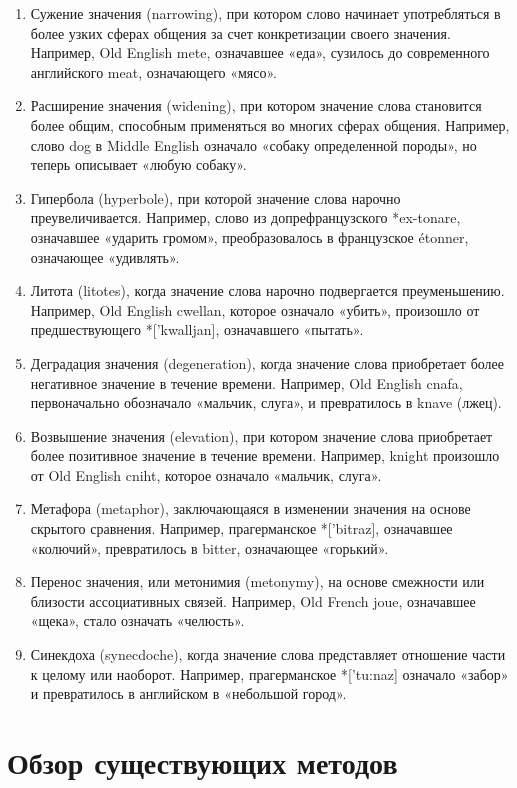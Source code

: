 \documentclass[LI,VKR]{HSEUniversity}
\begin{document}
\begin{enumerate}
    \item Сужение значения (narrowing), при котором слово начинает употребляться
в более узких сферах общения за счет конкретизации своего значения.
Например, Old English mete, означавшее «еда», сузилось до современного английского meat,
означающего «мясо».
    \item Расширение значения (widening), при котором значение слова становится более общим,
способным применяться во многих сферах общения.
Например, слово dog в Middle English означало «собаку определенной породы»,
но теперь описывает «любую собаку».
    \item Гипербола (hyperbole), при которой значение слова нарочно преувеличивается.
Например, слово из допрефранцузского *ex-tonare, означавшее «ударить громом»,
преобразовалось в французское étonner, означающее «удивлять».
    \item Литота (litotes), когда значение слова нарочно подвергается преуменьшению.
Например, Old English cwellan, которое означало «убить», произошло от
предшествующего *['kwalljan], означавшего «пытать».
    \item Деградация значения (degeneration), когда значение слова приобретает
более негативное значение в течение времени.
Например, Old English cnafa, первоначально обозначало «мальчик, слуга», и превратилось в knave
(лжец).
    \item Возвышение значения (elevation), при котором значение слова приобретает
более позитивное значение в течение времени.
Например, knight произошло от Old English cniht, которое означало «мальчик, слуга».
    \item Метафора (metaphor), заключающаяся в изменении значения на основе скрытого сравнения.
Например, прагерманское *['bitraz], означавшее «колючий», превратилось в bitter,
означающее «горький».
    \item Перенос значения, или метонимия (metonymy), на основе смежности
или близости ассоциативных связей.
Например, Old French joue, означавшее «щека», стало означать «челюсть».
    \item Синекдоха (synecdoche), когда значение слова представляет отношение
части к целому или наоборот.
Например, прагерманское *['tu:naz] означало «забор» и превратилось в английском в «небольшой город».
\end{enumerate}

\section{Обзор существующих методов}
\end{document}
